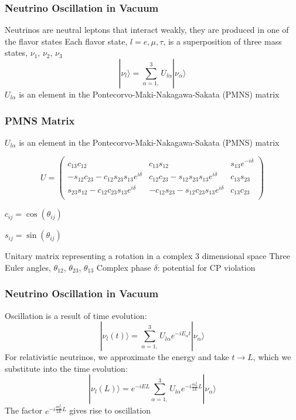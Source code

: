 \documentclass[10pt,professionalfonts,xcolor=table]{beamer}
\begin{document}
\frame
{
  \frametitle{Neutrino Oscillation in Vacuum}
  \begin{itemize}
  \bang Neutrinos are neutral leptons that interact weakly, they are produced in one of the flavor states
  \gap
  \bang Each flavor state, $l=e,\mu,\tau$,  is a superposition of three mass states, $\nu_1$, $\nu_2$, $\nu_3$
  \gap
  \begin{equation*}
|\nu_l \rangle = \sum_{\alpha = 1,}^3 U_{l\alpha}|\nu_\alpha \rangle
  \end{equation*}
  \gap
  \bang $U_{l\alpha}$ is an element in the Pontecorvo-Maki-Nakagawa-Sakata (PMNS) matrix
  \end{itemize}

}


\frame
{
  \frametitle{PMNS Matrix}
  \begin{itemize}
  \bang $U_{l\alpha}$ is an element in the Pontecorvo-Maki-Nakagawa-Sakata (PMNS) matrix
  \end{itemize}
  \begin{equation*}
 U = \begin{pmatrix} \label{pmns}
c_{13}c_{12}              &    c_{13}s_{12} 	   	 & 		s_{13} e^{-i\delta} \\
-s_{12}c_{23} - c_{12}s_{23}s_{13}e^{i\delta}	& c_{12}c_{23} - s_{12}s_{23}s_{13}e^{i\delta} 				& 		c_{13}s_{23}  \\
s_{23}s_{12} - c_{12}c_{23}s_{13}e^{i\delta}	& -c_{12}s_{23} - s_{12}c_{23}s_{13}e^{i\delta} 				& 		c_{13}c_{23}  \\
\end{pmatrix}
\end{equation*}
\begin{center}
\footnotesize
$c_{ij} = \cos(\theta_{ij})$

$s_{ij} = \sin(\theta_{ij})$
\end{center}
 \gap
  \begin{itemize}
\bang Unitary matrix representing a rotation in a complex 3 dimensional space
\gap
\bang Three Euler angles, $\theta_{12}$, $\theta_{23}$, $\theta_{13}$
\gap
\bang Complex phase $\delta$: potential for CP violation
  \end{itemize}
}

\frame
{
  \frametitle{Neutrino Oscillation in Vacuum}
  \begin{itemize}
	\bang Oscillation is a result of time evolution:
	\begin{equation*}
		|\nu_l(t) \rangle = \sum_{\alpha = 1,}^3 U_{l\alpha}e^{-iE_\alpha t}|\nu_\alpha \rangle
	\end{equation*}
	\bang For relativistic neutrinos, we approximate the energy and take $t \rightarrow L$, which we substitute into the time evolution:
	\begin{equation*}
		|\nu_l(L) \rangle = e^{-iEL} \sum_{\alpha = 1,}^3 U_{l\alpha}e^{-i\frac{m_\alpha^2}{2E} L}|\nu_\alpha \rangle
	\end{equation*}
  \gap
	\bang The factor $e^{-i\frac{m_\alpha^2}{2E} L}$ gives rise to oscillation


  \end{itemize}
}
\end{document}
